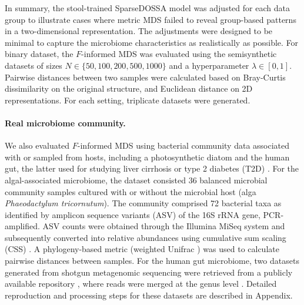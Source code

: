 \documentclass[10pt,letterpaper]{article}
\newcommand{\1}{{\rm 1}\kern-0.24em{\rm I}}
\begin{document}
In summary, the stool-trained SparseDOSSA model was adjusted for each data group to illustrate cases where metric MDS failed to reveal group-based patterns in a two-dimensional representation. The adjustments were designed to be minimal to capture the microbiome characteristics as realistically as possible. For binary dataset, the $F$-informed MDS was evaluated using the semisynthetic datasets of sizes $N\in\{50,100,200,500,1000\}$ and a hyperparameter $\lambda\in[0, 1]$. Pairwise distances between two samples were calculated based on Bray-Curtis dissimilarity on the original structure, and Euclidean distance on 2D representations. For each setting, triplicate datasets were generated.

\paragraph*{Real microbiome community.}
We also evaluated $F$-informed MDS using bacterial community data associated with or sampled from hosts, including a photosynthetic diatom \cite{kim22} and the human gut, the latter used for studying liver cirrhosis \cite{Qin14} or type 2 diabetes (T2D) \cite{Karlsson13, Qin12}. 
For the algal-associated microbiome, the dataset consisted 36 balanced microbial community samples cultured with or without the microbial host (alga \textit{Phaeodactylum tricornutum}). The community comprised 72 bacterial taxa as identified by amplicon sequence variants (ASV) of the 16S rRNA gene, PCR-amplified. ASV counts were obtained through the Illumina MiSeq system and subsequently converted into relative abundances using cumulative sum scaling (CSS) \cite{paulson13}. A phylogeny-based metric (weighted Unifrac \cite{lozupone07}) was used to calculate pairwise distances between samples.
For the human gut microbiome, two datasets generated from shotgun metagenomic sequencing were retrieved from a publicly available repository \cite{Pasolli16}, where reads were merged at the genus level \cite{reiman20}. Detailed reproduction and processing steps for these datasets are described in  Appendix.
\end{document}
